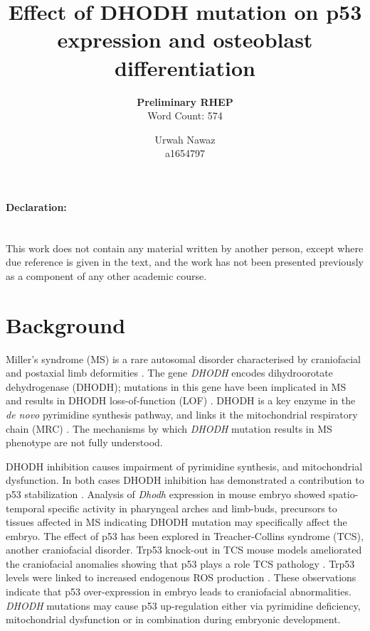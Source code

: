 \documentclass[12pt]{article}
\title{Effect of DHODH mutation on p53 expression and osteoblast differentiation}
\author{Urwah Nawaz \\ a1654797}
\subtitle{\textbf{Preliminary RHEP} \\Word Count: 574}
\date{}
\begin{document}
	\maketitle
\paragraph{Declaration:}
~\\This work does not contain any material written by another person, except where due reference is given in the text, and the work has not been presented previously as a component of any other academic course.	
 
 \pagebreak

	\section{Background}
Miller's syndrome (MS) is a rare autosomal disorder characterised by craniofacial and postaxial limb deformities \citep{miller1979postaxial}.  The gene \textit{DHODH} encodes dihydroorotate dehydrogenase (DHODH); mutations in this gene have been implicated in MS and results in DHODH loss-of-function (LOF) \citep{ng2010exome, doi:10.1093/hmg/dds218}. DHODH is a key enzyme in the \textit{de novo} pyrimidine synthesis pathway, and links it the mitochondrial respiratory chain (MRC) \citep{fang2013dihydro}. The mechanisms by which \textit{DHODH} mutation results in MS phenotype are not fully understood. 

DHODH inhibition causes impairment of pyrimidine synthesis, and mitochondrial dysfunction. In both cases DHODH inhibition has demonstrated a contribution to p53 stabilization  \citep{linke1996reversible, khutornenko2010pyrimidine, fairus2017dihydroorotate}. Analysis of \textit{Dhodh} expression in mouse embryo showed spatio-temporal specific activity in pharyngeal arches and limb-buds, precursors to tissues affected in MS \citep{doi:10.1093/hmg/dds218} indicating DHODH mutation may specifically affect the embryo. The effect of p53 has been explored in Treacher-Collins syndrome (TCS), another craniofacial disorder. Trp53 knock-out in TCS mouse models ameliorated the craniofacial anomalies showing that p53 plays a role TCS pathology \citep{jones2008prevention}. Trp53 levels were linked to increased endogenous ROS production \citep{sakai2016prevention}. These observations indicate that p53 over-expression in embryo leads to craniofacial abnormalities. \textit{DHODH} mutations may cause p53 up-regulation either via pyrimidine deficiency, mitochondrial dysfunction or in combination during embryonic development. 
\end{document}
